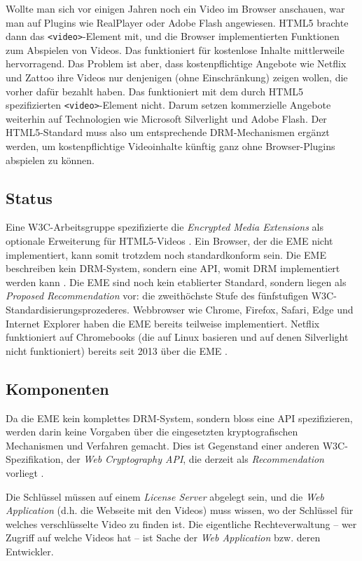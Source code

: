 \documentclass[a4paper,11pt]{scrartcl}
\begin{document}
Wollte man sich vor einigen Jahren noch ein Video im Browser anschauen, war man auf Plugins wie RealPlayer oder Adobe Flash angewiesen. HTML5 brachte dann das \texttt{<video>}-Element mit, und die Browser implementierten Funktionen zum Abspielen von Videos. Das funktioniert für kostenlose Inhalte mittlerweile hervorragend. Das Problem ist aber, dass kostenpflichtige Angebote wie Netflix und Zattoo ihre Videos nur denjenigen (ohne Einschränkung) zeigen wollen, die vorher dafür bezahlt haben. Das funktioniert mit dem durch HTML5 spezifizierten \texttt{<video>}-Element nicht. Darum setzen kommerzielle Angebote weiterhin auf Technologien wie Microsoft Silverlight und Adobe Flash. Der HTML5-Standard muss also um entsprechende DRM-Mechanismen ergänzt werden, um kostenpflichtige Videoinhalte künftig ganz ohne Browser-Plugins abspielen zu können.

\subsection{Status}

Eine W3C-Arbeitsgruppe spezifizierte die \textit{Encrypted Media Extensions} als optionale Erweiterung für HTML5-Videos \cite{w3c}. Ein Browser, der die EME nicht implementiert, kann somit trotzdem noch standardkonform sein. Die EME beschreiben kein DRM-System, sondern eine API, womit DRM implementiert werden kann \cite{html5rocks}. Die EME sind noch kein etablierter Standard, sondern liegen als \textit{Proposed Recommendation} vor: die zweithöchste Stufe des fünfstufigen W3C-Standardisierungsprozederes. Webbrowser wie Chrome, Firefox, Safari, Edge und Internet Explorer haben die EME bereits teilweise implementiert. Netflix funktioniert auf Chromebooks (die auf Linux basieren und auf denen Silverlight nicht funktioniert) bereits seit 2013 über die EME \cite{netflix}.

\subsection{Komponenten}

Da die EME kein komplettes DRM-System, sondern bloss eine API spezifizieren, werden darin keine Vorgaben über die eingesetzten kryptografischen Mechanismen und Verfahren gemacht. Dies ist Gegenstand einer anderen W3C-Spezifikation, der \textit{Web Cryptography API}, die derzeit als \textit{Recommendation} vorliegt \cite{w3c-crypto}.

Die Schlüssel müssen auf einem \textit{License Server} abgelegt sein, und die \textit{Web Application} (d.h. die Webseite mit den Videos) muss wissen, wo der Schlüssel für welches verschlüsselte Video zu finden ist. Die eigentliche Rechteverwaltung -- wer Zugriff auf welche Videos hat -- ist Sache der \textit{Web Application} bzw. deren Entwickler.
\end{document}
